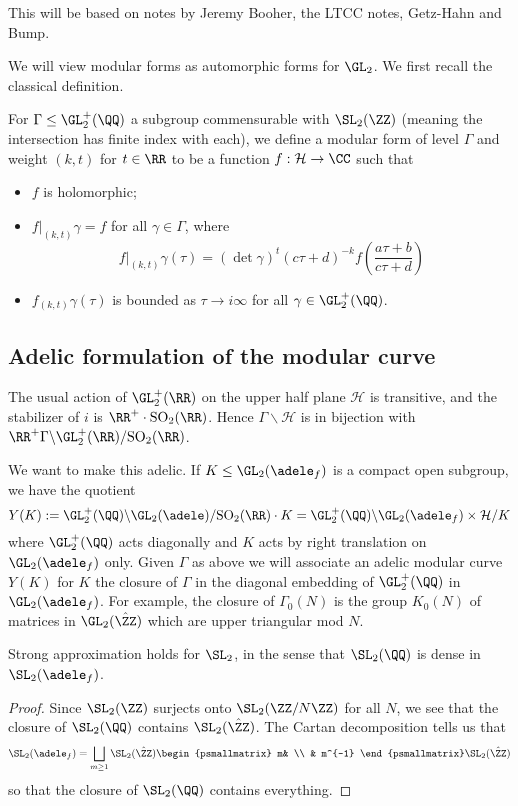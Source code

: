 This will be based on notes by Jeremy Booher, the LTCC notes, Getz-Hahn and Bump.

We will view modular forms as automorphic forms for $\GL_2$. We first recall the classical definition.

\begin{defn}
    For $\Gamma \leq \GL_2^+ (\QQ)$ a subgroup commensurable with $\SL_2 (\ZZ)$ (meaning the intersection has finite index with each), we define a modular form of level $\Gamma$ and weight $(k,t)$ for $t \in \RR$ to be a function $f: \mathcal H \to \CC$ such that
    \begin{itemize}
        \item $f$ is holomorphic;
        \item $f|_{(k,t)} \gamma = f$ for all $\gamma \in \Gamma$, where $$f|_{(k,t)} \gamma(\tau) = (\det \gamma)^t (c\tau+d)^{-k} f\left(\frac{a\tau+b }{c\tau +d}\right)$$
        \item $f_{(k,t)}\gamma(\tau)$ is bounded as $\tau \to i\infty$ for all $\gamma \in \GL_2^+ (\QQ)$.
    \end{itemize}
\end{defn}

\subsection{Adelic formulation of the modular curve}

The usual action of $\GL_2^+ (\RR)$ on the upper half plane $\mathcal H$ is transitive, and the stabilizer of $i$ is $\RR^+ \cdot \mathrm{SO}_2(\RR)$. Hence $\Gamma \backslash \mathcal H$ is in bijection with $\RR^+ \Gamma \backslash \GL_2^+ (\RR) / \mathrm{SO}_2 (\RR)$.

We want to make this adelic. If $K \leq \GL_2(\adele_f)$ is a compact open subgroup, we have the quotient
$$Y(K):= \GL_2^+(\QQ) \backslash \GL_2(\adele)/ \mathrm{SO}_2(\RR)\cdot K = \GL_2^+ (\QQ) \backslash \GL_2(\adele_f) \times \mathcal H/ K$$ where $\GL_2^+(\QQ)$ acts diagonally and $K$ acts by right translation on $\GL_2(\adele_f)$ only. Given $\Gamma$ as above we will associate an adelic modular curve $Y(K)$ for $K$ the closure of $\Gamma$ in the diagonal embedding of $\GL_2^+ (\QQ)$ in $\GL_2 (\adele_f)$. For example, the closure of $\Gamma_0(N)$ is the group $K_0(N)$ of matrices in $\GL_2(\hat{\ZZ})$ which are upper triangular mod $N$.

\begin{thm}
    Strong approximation holds for $\SL_2$, in the sense that $\SL_2(\QQ)$ is dense in $\SL_2(\adele_f)$.
\end{thm}
\begin{proof}
    Since $\SL_2(\ZZ)$ surjects onto $\SL_2(\ZZ/N\ZZ)$ for all $N$, we see that the closure of $\SL_2(\QQ)$ contains $\SL_2(\hat{\ZZ})$. The Cartan decomposition tells us that
    $$\SL_2(\adele_f) = \bigsqcup\limits_{m\geq 1} \SL_2(\hat{\ZZ})\begin{psmallmatrix}
        m& \\ & m^{-1}
    \end{psmallmatrix} \SL_2(\hat{\ZZ})$$ so that the closure of $\SL_2(\QQ)$ contains everything.
\end{proof}



